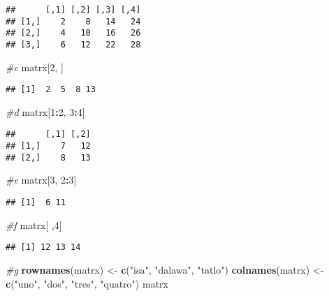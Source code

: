 \documentclass[
]{article}
\newenvironment{Shaded}{\begin{snugshade}}{\end{snugshade}}
\newcommand{\CommentTok}[1]{\textcolor[rgb]{0.56,0.35,0.01}{\textit{#1}}}
\newcommand{\DecValTok}[1]{\textcolor[rgb]{0.00,0.00,0.81}{#1}}
\newcommand{\FunctionTok}[1]{\textcolor[rgb]{0.13,0.29,0.53}{\textbf{#1}}}
\newcommand{\NormalTok}[1]{#1}
\newcommand{\OtherTok}[1]{\textcolor[rgb]{0.56,0.35,0.01}{#1}}
\newcommand{\SpecialCharTok}[1]{\textcolor[rgb]{0.81,0.36,0.00}{\textbf{#1}}}
\newcommand{\StringTok}[1]{\textcolor[rgb]{0.31,0.60,0.02}{#1}}
\begin{document}
\begin{verbatim}
##      [,1] [,2] [,3] [,4]
## [1,]    2    8   14   24
## [2,]    4   10   16   26
## [3,]    6   12   22   28
\end{verbatim}

\begin{Shaded}
\begin{Highlighting}[]
\CommentTok{\#c}
\NormalTok{matrx[}\DecValTok{2}\NormalTok{, ]}
\end{Highlighting}
\end{Shaded}

\begin{verbatim}
## [1]  2  5  8 13
\end{verbatim}

\begin{Shaded}
\begin{Highlighting}[]
\CommentTok{\#d}
\NormalTok{matrx[}\DecValTok{1}\SpecialCharTok{:}\DecValTok{2}\NormalTok{, }\DecValTok{3}\SpecialCharTok{:}\DecValTok{4}\NormalTok{]}
\end{Highlighting}
\end{Shaded}

\begin{verbatim}
##      [,1] [,2]
## [1,]    7   12
## [2,]    8   13
\end{verbatim}

\begin{Shaded}
\begin{Highlighting}[]
\CommentTok{\#e}
\NormalTok{matrx[}\DecValTok{3}\NormalTok{, }\DecValTok{2}\SpecialCharTok{:}\DecValTok{3}\NormalTok{]}
\end{Highlighting}
\end{Shaded}

\begin{verbatim}
## [1]  6 11
\end{verbatim}

\begin{Shaded}
\begin{Highlighting}[]
\CommentTok{\#f}
\NormalTok{matrx[ ,}\DecValTok{4}\NormalTok{]}
\end{Highlighting}
\end{Shaded}

\begin{verbatim}
## [1] 12 13 14
\end{verbatim}

\begin{Shaded}
\begin{Highlighting}[]
\CommentTok{\#g}
\FunctionTok{rownames}\NormalTok{(matrx) }\OtherTok{\textless{}{-}} \FunctionTok{c}\NormalTok{(}\StringTok{"isa"}\NormalTok{, }\StringTok{"dalawa"}\NormalTok{, }\StringTok{"tatlo"}\NormalTok{)}
\FunctionTok{colnames}\NormalTok{(matrx) }\OtherTok{\textless{}{-}} \FunctionTok{c}\NormalTok{(}\StringTok{"uno"}\NormalTok{, }\StringTok{"dos"}\NormalTok{, }\StringTok{"tres"}\NormalTok{, }\StringTok{"quatro"}\NormalTok{)}
\NormalTok{matrx}
\end{Highlighting}
\end{Shaded}
\end{document}
